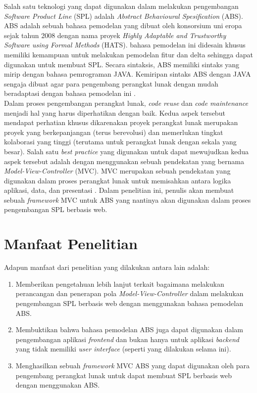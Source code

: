 Salah satu teknologi yang dapat digunakan dalam melakukan pengembangan \textit{Software Product Line} (SPL) adalah \textit{Abstract Behavioural Spesification} (ABS). ABS adalah sebuah bahasa pemodelan yang dibuat oleh konsorsium uni eropa sejak tahun 2008 dengan nama proyek \textit{Highly Adaptable and Trustworthy Software using Formal Methods} (HATS). bahasa pemodelan ini didesain khusus memiliki kemampuan untuk melakukan pemodelan fitur dan delta sehingga dapat digunakan untuk membuat SPL. Secara sintaksis, ABS memiliki sintaks yang mirip dengan bahasa pemrograman JAVA. Kemiripan sintaks ABS dengan JAVA sengaja dibuat agar para pengembang perangkat lunak dengan mudah beradaptasi dengan bahasa pemodelan ini \citep{hahnle2013hats}. \\

Dalam proses pengembangan perangkat lunak, \textit{code reuse} dan \textit{code maintenance} menjadi hal yang harus diperhatikan dengan baik. Kedua aspek tersebut mendapat perhatian khusus dikarenakan proyek perangkat lunak merupakan proyek yang berkepanjangan (terus berevolusi) dan memerlukan tingkat kolaborasi yang tinggi (terutama untuk perangkat lunak dengan sekala yang besar). Salah satu \textit{best practice} yang digunakan untuk dapat mewujudkan kedua aspek tersebut adalah dengan menggunakan sebuah pendekatan yang bernama \textit{Model-View-Controller} (MVC). MVC merupakan sebuah pendekatan yang digunakan dalam proses perangkat lunak untuk memisahkan antara logika aplikasi, data, dan presentasi \citep{leff2001web} \citep{krasner1988desc}. Dalam penelitian ini, penulis akan membuat sebuah \textit{framework} MVC untuk ABS yang nantinya akan digunakan dalam proses pengembangan SPL berbasis web.

\section{Manfaat Penelitian}
Adapun manfaat dari penelitian yang dilakukan antara lain adalah:
\begin{enumerate}
    \item Memberikan pengetahuan lebih lanjut terkait bagaimana melakukan perancangan dan penerapan pola \textit{Model-View-Controller} dalam melakukan pengembangan SPL berbasis web dengan menggunakan bahasa pemodelan ABS.
    \item Membuktikan bahwa bahasa pemodelan ABS juga dapat digunakan dalam pengembangan aplikasi \textit{frontend} dan bukan hanya untuk aplikasi \textit{backend} yang tidak memiliki \textit{user interface} (seperti yang dilakukan selama ini).
    \item Menghasilkan sebuah \textit{framework} MVC ABS yang dapat digunakan oleh para pengembang perangkat lunak untuk dapat membuat SPL berbasis web dengan menggunakan ABS.
\end{enumerate}

